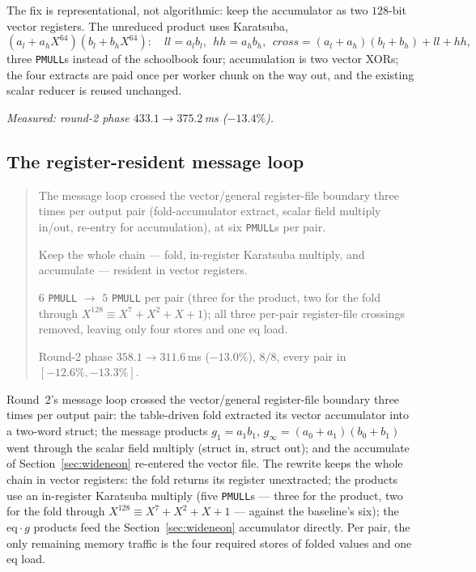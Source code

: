 \documentclass[11pt]{article}
\newcommand{\eq}{\mathrm{eq}}
\newcommand{\code}[1]{\texttt{#1}}
\newenvironment{optsummary}{%
  \begin{quote}\small
  \begin{description}
  \setlength{\itemsep}{1pt}\setlength{\parsep}{0pt}\setlength{\topsep}{2pt}
}{%
  \end{description}
  \end{quote}
}
\begin{document}
The fix is representational, not algorithmic: keep the accumulator as two
$128$-bit vector registers. The unreduced product uses Karatsuba,
\[
(a_l + a_h X^{64})(b_l + b_h X^{64}) : \quad
\mathit{ll}=a_l b_l,\ \ \mathit{hh}=a_h b_h,\ \
\mathit{cross}=(a_l{+}a_h)(b_l{+}b_h)+\mathit{ll}+\mathit{hh},
\]
three \code{PMULL}s instead of the schoolbook four; accumulation is two vector
XORs; the four extracts are paid once per worker chunk on the way out, and the
existing scalar reducer is reused unchanged.

\emph{Measured: round-2 phase $433.1\to375.2\,$ms ($-13.4\%$).}

\subsection{The register-resident message loop}\label{sec:qres}

\begin{optsummary}
\item[Baseline:] The message loop crossed the vector/general register-file boundary three times per output pair (fold-accumulator extract, scalar field multiply in/out, re-entry for accumulation), at six \code{PMULL}s per pair.
\item[Improvement:] Keep the whole chain --- fold, in-register Karatsuba multiply, and accumulate --- resident in vector registers.
\item[Mechanism:] $6$ \code{PMULL} $\to$ $5$ \code{PMULL} per pair (three for the product, two for the fold through $X^{128}\equiv X^7{+}X^2{+}X{+}1$); all three per-pair register-file crossings removed, leaving only four stores and one eq load.
\item[Result:] Round-2 phase $358.1\to311.6\,$ms ($-13.0\%$), $8/8$, every pair in $[-12.6\%,-13.3\%]$.
\end{optsummary}

Round~2's message loop crossed the vector/general register-file boundary three
times per output pair: the table-driven fold extracted its vector accumulator
into a two-word struct; the message products
$g_1 = a_1 b_1$, $g_\infty = (a_0{+}a_1)(b_0{+}b_1)$ went through the scalar
field multiply (struct in, struct out); and the accumulate of
Section~\ref{sec:wideneon} re-entered the vector file. The rewrite keeps the
whole chain in vector registers: the fold returns its register unextracted;
the products use an in-register Karatsuba multiply (five \code{PMULL}s ---
three for the product, two for the fold through $X^{128}\equiv X^7{+}X^2{+}X{+}1$
--- against the baseline's six); the $\eq\cdot g$ products feed the
Section~\ref{sec:wideneon} accumulator directly. Per pair, the only remaining
memory traffic is the four required stores of folded values and one eq load.
\end{document}
